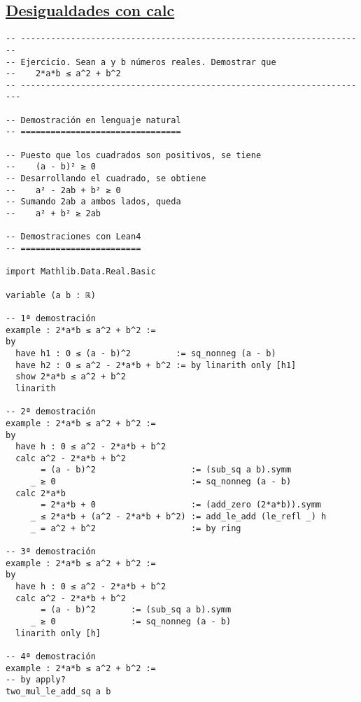 \subsection{\href{./src/Basicos/Desigualdades\_con\_calc.lean}{Desigualdades con calc}}
\label{sec:org35b6291}
\begin{verbatim}
-- ---------------------------------------------------------------------
-- Ejercicio. Sean a y b números reales. Demostrar que
--    2*a*b ≤ a^2 + b^2
-- ----------------------------------------------------------------------

-- Demostración en lenguaje natural
-- ================================

-- Puesto que los cuadrados son positivos, se tiene
--    (a - b)² ≥ 0
-- Desarrollando el cuadrado, se obtiene
--    a² - 2ab + b² ≥ 0
-- Sumando 2ab a ambos lados, queda
--    a² + b² ≥ 2ab

-- Demostraciones con Lean4
-- ========================

import Mathlib.Data.Real.Basic

variable (a b : ℝ)

-- 1ª demostración
example : 2*a*b ≤ a^2 + b^2 :=
by
  have h1 : 0 ≤ (a - b)^2         := sq_nonneg (a - b)
  have h2 : 0 ≤ a^2 - 2*a*b + b^2 := by linarith only [h1]
  show 2*a*b ≤ a^2 + b^2
  linarith

-- 2ª demostración
example : 2*a*b ≤ a^2 + b^2 :=
by
  have h : 0 ≤ a^2 - 2*a*b + b^2
  calc a^2 - 2*a*b + b^2
       = (a - b)^2                   := (sub_sq a b).symm
     _ ≥ 0                           := sq_nonneg (a - b)
  calc 2*a*b
       = 2*a*b + 0                   := (add_zero (2*a*b)).symm
     _ ≤ 2*a*b + (a^2 - 2*a*b + b^2) := add_le_add (le_refl _) h
     _ = a^2 + b^2                   := by ring

-- 3ª demostración
example : 2*a*b ≤ a^2 + b^2 :=
by
  have h : 0 ≤ a^2 - 2*a*b + b^2
  calc a^2 - 2*a*b + b^2
       = (a - b)^2       := (sub_sq a b).symm
     _ ≥ 0               := sq_nonneg (a - b)
  linarith only [h]

-- 4ª demostración
example : 2*a*b ≤ a^2 + b^2 :=
-- by apply?
two_mul_le_add_sq a b
\end{verbatim}

